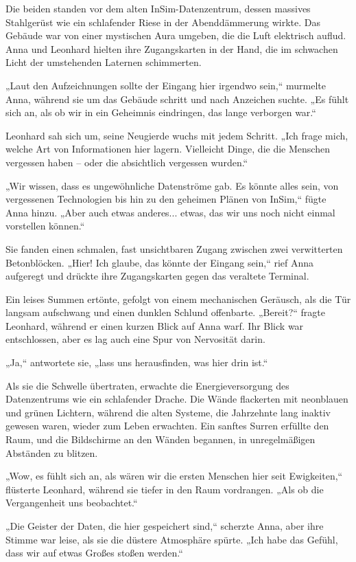 \documentclass[
]{article}
\begin{document}
Die beiden standen vor dem alten InSim-Datenzentrum, dessen massives
Stahlgerüst wie ein schlafender Riese in der Abenddämmerung wirkte. Das
Gebäude war von einer mystischen Aura umgeben, die die Luft elektrisch
auflud. Anna und Leonhard hielten ihre Zugangskarten in der Hand, die im
schwachen Licht der umstehenden Laternen schimmerten.

„Laut den Aufzeichnungen sollte der Eingang hier irgendwo sein,``
murmelte Anna, während sie um das Gebäude schritt und nach Anzeichen
suchte. „Es fühlt sich an, als ob wir in ein Geheimnis eindringen, das
lange verborgen war.``

Leonhard sah sich um, seine Neugierde wuchs mit jedem Schritt. „Ich
frage mich, welche Art von Informationen hier lagern. Vielleicht Dinge,
die die Menschen vergessen haben -- oder die absichtlich vergessen
wurden.``

„Wir wissen, dass es ungewöhnliche Datenströme gab. Es könnte alles
sein, von vergessenen Technologien bis hin zu den geheimen Plänen von
InSim,`` fügte Anna hinzu. „Aber auch etwas anderes... etwas, das wir
uns noch nicht einmal vorstellen können.``

Sie fanden einen schmalen, fast unsichtbaren Zugang zwischen zwei
verwitterten Betonblöcken. „Hier! Ich glaube, das könnte der Eingang
sein,`` rief Anna aufgeregt und drückte ihre Zugangskarten gegen das
veraltete Terminal.

Ein leises Summen ertönte, gefolgt von einem mechanischen Geräusch, als
die Tür langsam aufschwang und einen dunklen Schlund offenbarte.
„Bereit?{\kern0pt}`` fragte Leonhard, während er einen kurzen Blick auf
Anna warf. Ihr Blick war entschlossen, aber es lag auch eine Spur von
Nervosität darin.

„Ja,`` antwortete sie, „lass uns herausfinden, was hier drin ist.``

Als sie die Schwelle übertraten, erwachte die Energieversorgung des
Datenzentrums wie ein schlafender Drache. Die Wände flackerten mit
neonblauen und grünen Lichtern, während die alten Systeme, die
Jahrzehnte lang inaktiv gewesen waren, wieder zum Leben erwachten. Ein
sanftes Surren erfüllte den Raum, und die Bildschirme an den Wänden
begannen, in unregelmäßigen Abständen zu blitzen.

„Wow, es fühlt sich an, als wären wir die ersten Menschen hier seit
Ewigkeiten,`` flüsterte Leonhard, während sie tiefer in den Raum
vordrangen. „Als ob die Vergangenheit uns beobachtet.``

„Die Geister der Daten, die hier gespeichert sind,`` scherzte Anna, aber
ihre Stimme war leise, als sie die düstere Atmosphäre spürte. „Ich habe
das Gefühl, dass wir auf etwas Großes stoßen werden.``
\end{document}
